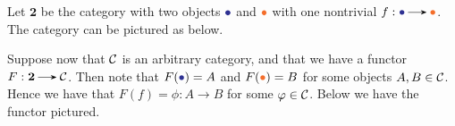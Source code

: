     \begin{example}
        Let $\bm{2}$ be the category with two objects $\textcolor{Blue}{\bullet}$ 
        and $\textcolor{Orange}{\bullet}$ with one nontrivial $f: \textcolor{Blue}{\bullet} \to \textcolor{Orange}{\bullet}$. 
        The category can be pictured as below. 
        \begin{center}
        \end{center}
        Suppose now that $\mathcal{C}$ is an arbitrary category, and that we 
        have a functor $F: \bm{2} \to \cc$. Then note that $F(\textcolor{Blue}{\bullet}) = A$ 
        and $F(\textcolor{Orange}{\bullet}) = B$ for some objects $A, B \in \mathcal{C}$. Hence we have that 
        $F(f) = \phi: A \to B$ for some $\varphi \in \mathcal{C}$. Below we have the functor pictured. 
        \begin{center}
\end{center}
\end{example}
